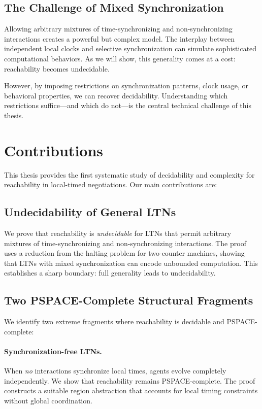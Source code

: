 \subsection{The Challenge of Mixed Synchronization}

Allowing arbitrary mixtures of time-synchronizing and non-synchronizing interactions creates a powerful but complex model. The interplay between independent local clocks and selective synchronization can simulate sophisticated computational behaviors. As we will show, this generality comes at a cost: reachability becomes undecidable.

However, by imposing restrictions on synchronization patterns, clock usage, or behavioral properties, we can recover decidability. Understanding which restrictions suffice—and which do not—is the central technical challenge of this thesis.

\section{Contributions}

This thesis provides the first systematic study of decidability and complexity for reachability in local-timed negotiations. Our main contributions are:

\subsection{Undecidability of General LTNs}

We prove that reachability is \emph{undecidable} for LTNs that permit arbitrary mixtures of time-synchronizing and non-synchronizing interactions. The proof uses a reduction from the halting problem for two-counter machines, showing that LTNs with mixed synchronization can encode unbounded computation. This establishes a sharp boundary: full generality leads to undecidability.

\subsection{Two PSPACE-Complete Structural Fragments}

We identify two extreme fragments where reachability is decidable and PSPACE-complete:

\paragraph{Synchronization-free LTNs.} When \emph{no} interactions synchronize local times, agents evolve completely independently. We show that reachability remains PSPACE-complete. The proof constructs a suitable region abstraction that accounts for local timing constraints without global coordination.

